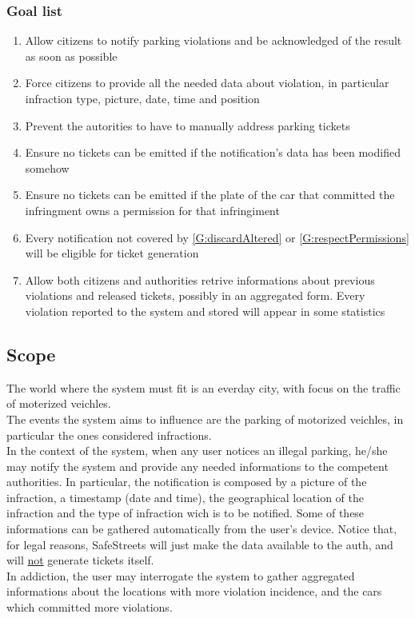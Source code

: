 \documentclass{article}
\newcommand{\enum}[1]{\texttt{#1.\arabic*}}
\begin{document}
		\subsubsection{Goal list}
			\begin{enumerate}[label=\enum{G}]
				\item  \label{G:realTime}Allow citizens to notify parking violations and be acknowledged of the result as soon as possible
				\item \label{G:allData}Force citizens to provide all the needed data about violation, in particular infraction type, picture, date, time and position
				\item \label{G:helpAuth}Prevent the autorities to have to manually address parking tickets
				\item \label{G:discardAltered} Ensure no tickets can be emitted if the notification's data has been modified somehow
				\item \label{G:respectPermissions} Ensure no tickets can be emitted if the plate of the car that committed the infringment owns a permission for that infringiment
				\item \label{G:storeFine} Every notification not covered by \ref{G:discardAltered} or \ref{G:respectPermissions} will be eligible for ticket generation
				\item \label{G:statistics}Allow both citizens and authorities retrive informations about previous violations and released tickets, possibly in an aggregated form. Every violation reported to the system and stored will appear in some statistics
				
			\end{enumerate}

	\subsection{Scope} 
	The world where the system must fit is an everday city, with focus on the traffic of moterized veichles.\\
	The events the system aims to influence are the parking of motorized veichles,  in particular the ones considered infractions.\\
	In the context of the system, when any user notices an illegal parking, he/she may notify the system and provide any needed informations to the competent authorities. In particular, the notification is composed by a picture of the infraction, a timestamp (date and time), the geographical location of the infraction and the type of infraction wich is to be notified. Some of these informations can be gathered automatically from the user's device. Notice that, for legal reasons, SafeStreets will just make the data available to the auth, and will \underline{not} generate tickets itself. \\
	In addiction, the user may interrogate the system to gather aggregated informations about the locations with more violation incidence, and the cars which committed more violations. 
	
\end{document}
